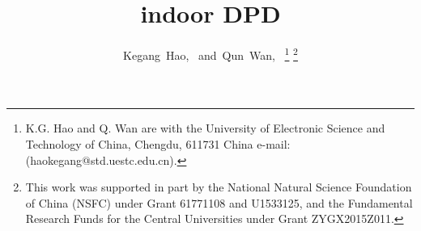 \documentclass[journal]{IEEEtran}
\begin{document}
\title{indoor DPD}

\author{Kegang~Hao,~
        and~Qun~Wan,~%
\thanks{K.G. Hao and Q. Wan are with the University of Electronic Science and Technology of China, Chengdu, 611731 China e-mail: (haokegang@std.uestc.edu.cn).}%
\thanks{This work was supported in part by the National Natural Science Foundation of China (NSFC) under Grant 61771108 and U1533125, and the Fundamental Research Funds for the Central Universities under Grant ZYGX2015Z011.}
}

\maketitle

\begin{abstract}


\end{abstract}

\begin{IEEEkeywords}


\end{IEEEkeywords}


\IEEEpeerreviewmaketitle
\end{document}
